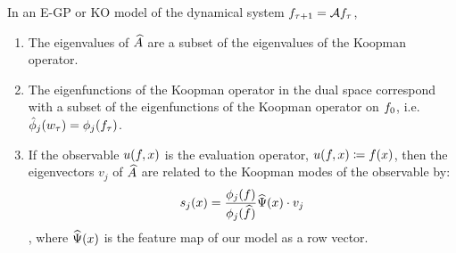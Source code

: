 \begin{theorem}\label{thm:DualApproxModes}
	In an E-GP or KO model of the dynamical system $ f_{\tau+1} = \mathcal{A} f_{\tau}$,
	\begin{enumerate}
		\item The eigenvalues of $\widehat{A}$ are a subset of the eigenvalues of the Koopman operator.
		\item The eigenfunctions of the Koopman operator in the dual space correspond with a subset of the eigenfunctions of the Koopman operator on $f_0$, i.e. $\hat\phi_j(w_{\tau}) = \phi_j(f_{\tau})$.
		\item If the observable $u(f,x)$ is the evaluation operator, $u(f,x) \coloneqq f(x)$, then the eigenvectors $v_j$ of $\widehat{A}$ are related to the Koopman modes of the observable by:
		\begin{align}
			s_j (x) = \frac{\phi_j(f)}{\phi_j(\widehat{f})} \widehat{\Psi}(x) \cdot v_j
		\end{align},
		where $\widehat{\Psi}(x)$ is the feature map of our model as a row vector.
	\end{enumerate} 
\end{theorem}
